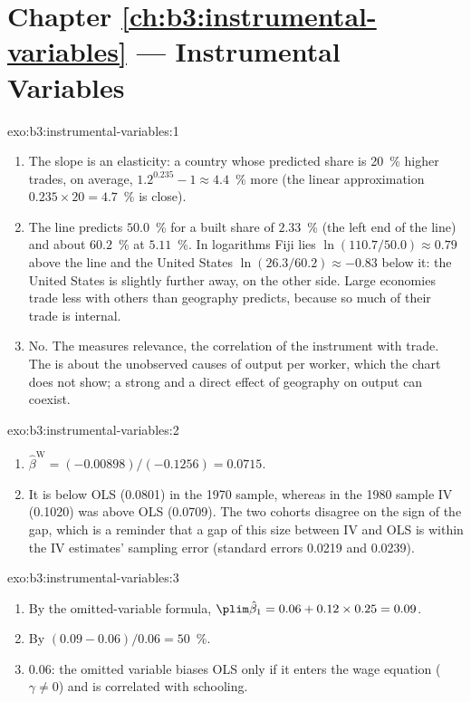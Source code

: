 \section*{Chapter \ref{ch:b3:instrumental-variables} --- Instrumental Variables}

\begin{solution}{exo:b3:instrumental-variables:1}
\begin{enumerate}
\item The slope is an elasticity: a country whose predicted share is 20~\%
higher trades, on average, $1.2^{0.235} - 1 \approx 4.4$~\% more (the linear
approximation $0.235 \times 20 = 4.7$~\% is close).
\item The line predicts $50.0$~\% for a built share of $2.33$~\% (the left end
of the line) and about $60.2$~\% at $5.11$~\%. %
In logarithms Fiji lies $\ln(110.7/50.0) \approx 0.79$ above the line and the
United States $\ln(26.3/60.2) \approx -0.83$ below it: the United States is
slightly further away, on the other side. Large economies trade less with
others than geography predicts, because so much of their trade is internal.
\item No. The  measures relevance, the correlation of the instrument
with trade. The  is about the unobserved causes of output
per worker, which the chart does not show; a strong  and a direct
effect of geography on output can coexist.
\end{enumerate}
\end{solution}

\begin{solution}{exo:b3:instrumental-variables:2}
\begin{enumerate}
\item $\hat\beta^{\mathrm{W}} = (-0.00898)/(-0.1256) = 0.0715$. %
\item It is below OLS (0.0801) in the 1970 sample, whereas in the 1980 sample
IV (0.1020) was above OLS (0.0709). The two cohorts disagree on the sign of
the gap, which is a reminder that a gap of this size between IV and OLS is
within the IV estimates' sampling error (standard errors 0.0219 and 0.0239).
\end{enumerate}
\end{solution}

\begin{solution}{exo:b3:instrumental-variables:3}
\begin{enumerate}
\item By the omitted-variable formula, $\plim \hat\beta_1 = 0.06 + 0.12 \times
0.25 = 0.09$.
\item By $(0.09 - 0.06)/0.06 = 50$~\%.
\item $0.06$: the omitted variable biases OLS only if it enters the wage
equation ($\gamma \neq 0$) and is correlated with schooling.
\end{enumerate}
\end{solution}

